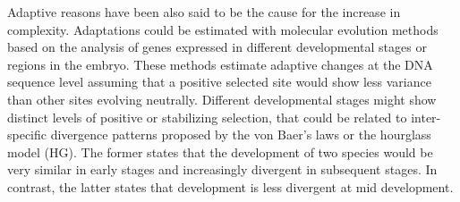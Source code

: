 \hfill\break 
Adaptive reasons have been also said to be the cause for the increase in complexity.
%
%
%
Adaptations could be estimated with molecular evolution methods based on the analysis of genes expressed in different developmental stages or regions in the embryo. 
These methods estimate adaptive changes at the DNA sequence level assuming that
a positive selected site would show less variance than other sites evolving neutrally.
%
%
Different developmental stages might show distinct levels of positive or stabilizing selection, 
that could be related to inter-specific divergence patterns proposed by the von Baer's laws or the hourglass model (HG). 
The former states that the development of two species would be very similar in early stages and increasingly divergent in subsequent stages. In contrast, the latter states that development is less divergent at mid development.

